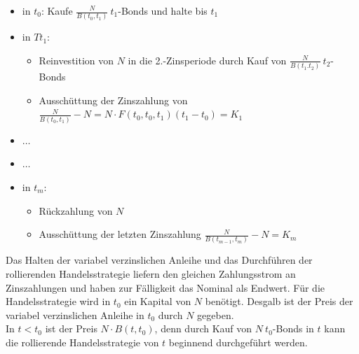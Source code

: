 \begin{itemize}
	\item in $t_0$: Kaufe $\frac{N}{B(t_0,t_1)}~t_1$-Bonds und halte bis $t_1$
	\item in $Tt_1$: 
	\begin{itemize}
		\item Reinvestition von $N$ in die 2.-Zinsperiode durch Kauf von $\frac{N}{B(t_1.t_2)}~t_2$-Bonds
		\item Ausschüttung der Zinszahlung von $\frac{N}{B(t_0,t_1)}-N=N\cdot F(t_0,t_0,t_1)(t_1-t_0)=K_1$
	\end{itemize}
	\item $\dots$
	\item$\dots$
	\item in $t_m$:
	\begin{itemize}
		\item Rückzahlung von $N$
		\item Ausschüttung der letzten Zinszahlung $\frac{N}{B(t_{m-1},t_m)}-N=K_m$
	\end{itemize}
\end{itemize}
Das Halten der variabel verzinslichen Anleihe und das Durchführen der rollierenden Handelsstrategie liefern den gleichen Zahlungsstrom an Zinszahlungen und haben zur Fälligkeit das Nominal als Endwert. Für die Handelsstrategie wird in $t_0$ ein Kapital von $N$ benötigt. Desgalb ist der Preis der variabel verzinslichen Anleihe in $t_0$ durch $N$ gegeben. \\
In $t<t_0$ ist der Preis $N\cdot B(t,t_0)$, denn durch Kauf von $N~t_0$-Bonds in $t$ kann die rollierende Handelsstrategie von $t$ beginnend durchgeführt werden.

